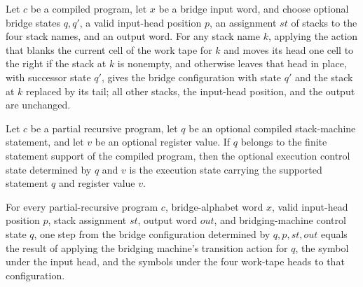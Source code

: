 \begin{lemma}
\label{Turing.bridgeCfg_pop_any}
\leanok
{}
Let $c$ be a compiled program, let $x$ be a bridge input word, and choose optional
bridge states $q,q'$, a valid input-head position $p$, an assignment $st$ of stacks to
the four stack names, and an output word. For any stack name $k$, applying the action
that blanks the current cell of the work tape for $k$ and moves its head one cell to the
right if the stack at $k$ is nonempty, and otherwise leaves that head in place, with
successor state $q'$, gives the bridge configuration with state $q'$ and the stack at
$k$ replaced by its tail; all other stacks, the input-head position, and the output are
unchanged.
\end{lemma}

\begin{lemma}
\label{Turing.bridgeExec_mem}
\leanok
{}
Let $c$ be a partial recursive program, let $q$ be an optional compiled stack-machine
statement, and let $v$ be an optional register value. If $q$ belongs to the finite
statement support of the compiled program, then the optional execution control state
determined by $q$ and $v$ is the execution state carrying the supported statement $q$
and register value $v$.
\end{lemma}

\begin{lemma}
\label{Turing.bridge_step}
\leanok
{}
For every partial-recursive program $c$, bridge-alphabet word $x$, valid input-head
position $p$, stack assignment $st$, output word $out$, and bridging-machine control
state $q$, one step from the bridge configuration determined by $q,p,st,out$ equals the
result of applying the bridging machine's transition action for $q$, the symbol under
the input head, and the symbols under the four work-tape heads to that configuration.
\end{lemma}

